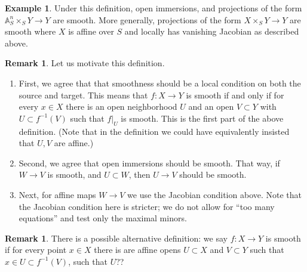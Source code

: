 \documentclass[10pt]{article}
\theoremstyle{definition}
\newtheorem{exmp}[thm]{Example}
\newtheorem{rmk}[thm]{Remark}
\begin{document}
\begin{exmp}
Under this definition, open immersions, and projections of the form $\mathbb{A}^n_S \times_S Y \rightarrow Y$ are smooth.  More generally, projections of the form $X \times_S Y \rightarrow Y$ are smooth where $X$ is affine over $S$ and locally has vanishing Jacobian as described above.
\end{exmp}

\begin{rmk}
Let us motivate this definition.
\begin{enumerate}
\item First, we agree that that smoothness should be a local condition on both the source and target.  This means that $f: X \rightarrow Y$ is smooth if and only if for every $x \in X$ there is an open neighborhood $U$ and an open $V \subset Y$ with $U \subset f^{-1}(V)$ such that $f|_U$ is smooth.  This is the first part of the above definition.  (Note that in the definition we could have equivalently insisted that $U, V$ are affine.)
\item Second, we agree that open immersions should be smooth.  That way, if $W \rightarrow V$ is smooth, and $U \subset W$, then $U \rightarrow V$ should be smooth.
\item Next, for affine maps $W \rightarrow V$ we use the Jacobian condition above.  Note that the Jacobian condition here is stricter; we do not allow for ``too many equations'' and test only the maximal minors.
\end{enumerate}
\end{rmk}

\begin{rmk}
There is a possible alternative definition: we say $f: X \rightarrow Y$ is smooth if for every point $x \in X$ there is are affine opens $U \subset X$ and $V \subset Y$ such that $x \in U \subset f^{-1}(V)$, such that $U $??
\end{rmk}
\end{document}
